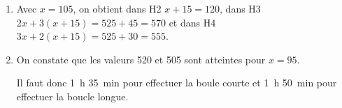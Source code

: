 \begin{enumerate}
\item %
Avec $x = 105$, on obtient dans H2 $x + 15 = 120$, dans H3 $2x + 3(x + 15) = 525 + 45 = 570$ et dans H4 $3x + 2(x + 15) = 525 + 30 = 555$. 
\item %
On constate que les valeurs 520 et 505 sont atteintes pour $x = 95$.

Il faut donc 1~h 35~min pour effectuer la boule courte et 1~h 50~min pour effectuer la boucle longue. 
\end{enumerate}
 
\vspace{0,5cm}

